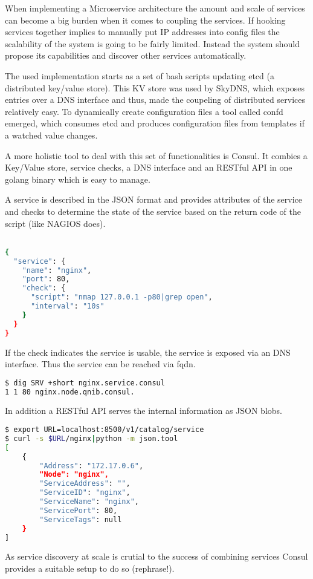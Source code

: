 When implementing a Microservice architecture the amount and scale of services can become a big burden when it comes to coupling the services.
If hooking services together implies to manually put IP addresses into config files the scalability of the system is going to be fairly limited.
Instead the system should propose its capabilities and discover other services automatically.

The used implementation starts as a set of bash scripts updating etcd (a distributed key/value store). This KV store was used by SkyDNS, which exposes entries
over a DNS interface and thus, made the coupeling of distributed services relatively easy. To dynamically create configuration files a tool called confd emerged, which consumes
etcd and produces configuration files from templates if a watched value changes.

A more holistic tool to deal with this set of functionalities is Consul. It combies a Key/Value store, service checks, a DNS interface and an RESTful API
in one golang binary which is easy to manage.

A service is described in the JSON format and provides attributes of the service and checks to determine the state of the service based on the return code of the script (like NAGIOS does).

\begin{lstlisting}[language=bash,
    caption={Service definition within consul.},
    label={lst:srv_json}]

{
  "service": {
    "name": "nginx",
    "port": 80,
    "check": {
      "script": "nmap 127.0.0.1 -p80|grep open",
      "interval": "10s"
    }
  }
}
\end{lstlisting}

If the check indicates the service is usable, the service is exposed via an DNS interface.
Thus the service can be reached via \gls{fqdn}.
\begin{lstlisting}[language=bash,
    caption={Exposure of services via DNS.},
    label={lst:dig_nginx}]
$ dig SRV +short nginx.service.consul
1 1 80 nginx.node.qnib.consul.
\end{lstlisting}

In addition a RESTful API serves the internal information as JSON blobs.

\begin{lstlisting}[language=bash,
    caption={Exposure of services via RESTful API.},
    label={lst:curl_nginx}]
$ export URL=localhost:8500/v1/catalog/service
$ curl -s $URL/nginx|python -m json.tool
[
    {
        "Address": "172.17.0.6",
        "Node": "nginx",
        "ServiceAddress": "",
        "ServiceID": "nginx",
        "ServiceName": "nginx",
        "ServicePort": 80,
        "ServiceTags": null
    }
]
\end{lstlisting}

As service discovery at scale is crutial to the success of combining services Consul provides a suitable setup to do so (rephrase!).